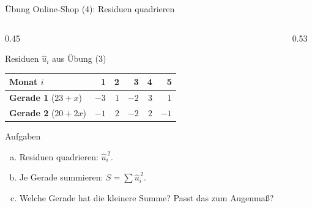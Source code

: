 \documentclass[aspectratio=169,11pt]{beamer}
\newcommand{\uebpunkte}{\addplot[only marks, mark=*, mark size=2.6pt, color=hsbiblue]
  coordinates {(1,21) (2,26) (3,24) (4,30) (5,29)};}
\begin{document}
\begin{frame}{Übung Online-Shop (4): Residuen quadrieren}
  \begin{columns}[T]
    \begin{column}{0.45\textwidth}
      \begin{block}{Residuen $\hat{u}_i$ aus Übung (3)}
        \centering\small
        \renewcommand{\arraystretch}{1.1}\setlength{\tabcolsep}{4pt}
        \begin{tabular}{l*{5}{r}}
          \toprule
          Monat $i$                                          & 1    & 2   & 3    & 4   & 5    \\
          \midrule
          {\color{hsbiaccent}\textbf{Gerade 1}} ($23 + x$)   & $-3$ & $1$ & $-2$ & $3$ & $1$  \\
          {\color{hsbiviolet}\textbf{Gerade 2}} ($20 + 2x$)  & $-1$ & $2$ & $-2$ & $2$ & $-1$ \\
          \bottomrule
        \end{tabular}
      \end{block}
      \begin{exampleblock}{Aufgaben}
        \begin{enumerate}[a)]
          \item Residuen quadrieren: $\hat{u}_i^{\,2}$.
          \item Je Gerade summieren: $S = \sum \hat{u}_i^{\,2}$.
          \item Welche Gerade hat die kleinere Summe? Passt das zum Augenmaß?
        \end{enumerate}
      \end{exampleblock}
    \end{column}
    \begin{column}{0.53\textwidth}
    \end{column}
  \end{columns}
\end{frame}
\end{document}
